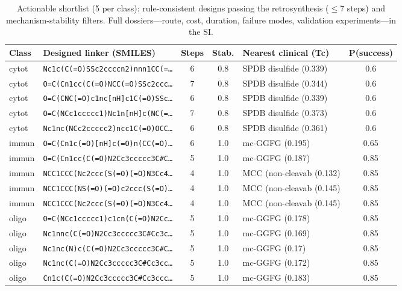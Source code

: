 \documentclass[10pt]{article}
\begin{document}
\begin{table}[t]\centering\caption{Actionable shortlist (5 per class): rule-consistent designs passing the retrosynthesis ($\le$7 steps) and mechanism-stability filters. Full dossiers---route, cost, duration, failure modes, validation experiments---in the SI.}\label{tab:dossier}\scriptsize
\begin{tabular}{l l c c l c}\toprule
Class & Designed linker (SMILES) & Steps & Stab. & Nearest clinical (Tc) & P(success) \\ \midrule
cytot & \texttt{Nc1c(C(=O)SSc2ccccn2)nnn1CC(=\ldots{}} & 6 & 0.8 & SPDB disulfide (0.339) & 0.6 \\
cytot & \texttt{O=C(Cn1cc(C(=O)NCC(=O)SSc2ccc\ldots{}} & 7 & 0.8 & SPDB disulfide (0.344) & 0.6 \\
cytot & \texttt{O=C(CNC(=O)c1nc[nH]c1C(=O)SSc\ldots{}} & 6 & 0.8 & SPDB disulfide (0.339) & 0.6 \\
cytot & \texttt{O=C(NCc1ccccc1)Nc1n[nH]c(NC(=\ldots{}} & 7 & 0.8 & SPDB disulfide (0.373) & 0.6 \\
cytot & \texttt{Nc1nc(NCc2ccccc2)ncc1C(=O)OCC\ldots{}} & 6 & 0.8 & SPDB disulfide (0.361) & 0.6 \\
immun & \texttt{O=C(Cn1c(=O)[nH]c(=O)n(CC(=O)\ldots{}} & 6 & 1.0 & mc-GGFG (0.195) & 0.65 \\
immun & \texttt{O=C(Cn1cc(C(=O)N2Cc3ccccc3C\#C\ldots{}} & 5 & 1.0 & mc-GGFG (0.187) & 0.85 \\
immun & \texttt{NCC1CCC(Nc2ccc(S(=O)(=O)N3Cc4\ldots{}} & 4 & 1.0 & MCC (non-cleavab (0.132) & 0.85 \\
immun & \texttt{NCC1CCC(NS(=O)(=O)c2ccc(S(=O)\ldots{}} & 4 & 1.0 & MCC (non-cleavab (0.145) & 0.85 \\
immun & \texttt{NCC1CCC(Nc2ccc(S(=O)(=O)N3Cc4\ldots{}} & 4 & 1.0 & MCC (non-cleavab (0.145) & 0.85 \\
oligo & \texttt{O=C(NCc1ccccc1)c1cn(C(=O)N2Cc\ldots{}} & 5 & 1.0 & mc-GGFG (0.178) & 0.85 \\
oligo & \texttt{Nc1nnc(C(=O)N2Cc3ccccc3C\#Cc3c\ldots{}} & 5 & 1.0 & mc-GGFG (0.169) & 0.85 \\
oligo & \texttt{Nc1nc(N)c(C(=O)N2Cc3ccccc3C\#C\ldots{}} & 5 & 1.0 & mc-GGFG (0.17) & 0.85 \\
oligo & \texttt{Nc1nc(C(=O)N2Cc3ccccc3C\#Cc3cc\ldots{}} & 5 & 1.0 & mc-GGFG (0.172) & 0.85 \\
oligo & \texttt{Cn1c(C(=O)N2Cc3ccccc3C\#Cc3ccc\ldots{}} & 5 & 1.0 & mc-GGFG (0.183) & 0.85 \\
\bottomrule\end{tabular}\end{table}
\end{document}
